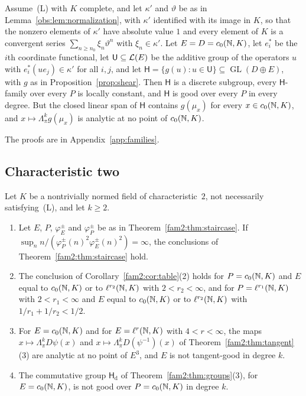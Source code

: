 \begin{proposition}\label{fam2:prop:span}
Assume~\textup{(L)} with $K$ complete, and let $\kappa'$ and $\vartheta$ be as in Lemma~\ref{obs:lem:normalization}, with
$\kappa'$ identified with its image in $K$, so that the nonzero elements of $\kappa'$ have absolute value $1$ and every
element of $K$ is a convergent series $\sum_{n\ge n_0}\xi_n\vartheta^n$ with $\xi_n\in\kappa'$. Let $E=D=c_0(\mathbb N,K)$, let
$e^*_i$ be the $i$th coordinate functional, let $\mathsf U\subseteq\mathcal L(E)$ be the additive group of the operators $u$ with
$e^*_i(ue_j)\in\kappa'$ for all $i,j$, and let $\mathsf H=\{g(u):u\in\mathsf U\}\subseteq\operatorname{GL}(D\oplus E)$, with
$g$ as in Proposition~\ref{prop:shear}. Then $\mathsf H$ is a discrete subgroup, every $\mathsf H$-family over every $P$ is
locally constant, and $\mathsf H$ is good over every $P$ in every degree. But the closed linear span of $\mathsf H$
contains $g(\mu_x)$ for every $x\in c_0(\mathbb N,K)$, and $x\mapsto\Lambda^k_\pi g(\mu_x)$ is analytic at no point of
$c_0(\mathbb N,K)$.
\end{proposition}

The proofs are in Appendix~\ref{app:families}.

\subsection{Characteristic two}\label{fam2:ssec:char-two}

\begin{proposition}\label{fam2:prop:char-two}
Let $K$ be a nontrivially normed field of characteristic~$2$, not necessarily satisfying~\textup{(L)}, and let $k\ge2$.
\begin{enumerate}
\item Let $E$, $P$, $\varphi^\pm_E$ and $\varphi^\pm_P$ be as in Theorem~\ref{fam2:thm:staircase}. If
$\sup_nn/(\varphi^\pm_P(n)^2\varphi^\pm_E(n)^2)=\infty$, the conclusions of Theorem~\ref{fam2:thm:staircase} hold.
\item The conclusion of Corollary~\ref{fam2:cor:table}(2) holds for $P=c_0(\mathbb N,K)$ and $E$ equal to $c_0(\mathbb N,K)$ or to
$\ell^{r_2}(\mathbb N,K)$ with $2<r_2<\infty$, and for $P=\ell^{r_1}(\mathbb N,K)$ with $2<r_1<\infty$ and $E$ equal to $c_0(\mathbb N,K)$ or
to $\ell^{r_2}(\mathbb N,K)$ with $1/r_1+1/r_2<1/2$.
\item For $E=c_0(\mathbb N,K)$ and for $E=\ell^r(\mathbb N,K)$ with $4<r<\infty$, the maps $x\mapsto\Lambda^k_\pi D\psi(x)$ and
$x\mapsto\Lambda^k_\pi D(\psi^{-1})(x)$ of Theorem~\ref{fam2:thm:tangent}(3) are analytic at no point of $E^3$, and $E$
is not tangent-good in degree $k$.
\item The commutative group $\mathsf H_{\mathrm d}$ of Theorem~\ref{fam2:thm:groups}(3), for $E=c_0(\mathbb N,K)$, is not good
over $P=c_0(\mathbb N,K)$ in degree $k$.
\end{enumerate}
\end{proposition}

